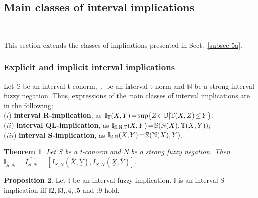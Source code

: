 \documentclass[12pt]{article}
\theoremstyle{plain}
\newtheorem{theorem}{Theorem}[section]
\theoremstyle{remark}
\theoremstyle{definition}
\theoremstyle{proposition}
\newtheorem{proposition}[theorem]{Proposition}
\newcommand{\II}{\mathbb{I} }
\newcommand{\UU}{\mathbb{U} }
\newcommand{\NN}{\mathbb{N} }
\newcommand{\TT}{\mathbb{T} }
\newcommand{\Ss}{\mathbb{S} }
\begin{document}
\subsection{Main classes of interval implications}~\label{subsec_int_class}

This section extends the classes of implications presented in Sect.~\ref{subsec-5a}.\vspace{-0.2cm}

\subsubsection{Explicit and implicit interval implications}\label{subsec-6a}

Let $\mathbb{S}$ be an interval t-conorm, $\mathbb{T}$ be an interval t-norm and $\NN$ be a strong interval fuzzy negation. Thus, expressions of the main classes of interval implications are in the following:\\
($i$) \hspace{-0.1cm}\textbf{interval R-implication}, as $\II_{\mathbb{T}}(X,Y)\hspace{-0.05cm}=\hspace{-0.05cm}\sup\{Z\hspace{-0.05cm}\in\hspace{-0.05cm} \UU|\TT(X,Z)\hspace{-0.05cm}\leq\hspace{-0.05cm}Y\}$;\\
($ii$)\hspace{-0.1cm} \textbf{interval QL-implication}, as $\II_{\Ss,\NN,\TT}(X,Y)\hspace{-0.05cm}=\hspace{-0.05cm}\Ss(\NN(X),\TT(X,Y));$\\
($iii$)\hspace{-0.1cm} \textbf{interval S-implication}, as $\II_{\Ss,\NN}(X,Y)\hspace{-0.05cm}=\hspace{-0.05cm}\Ss(\NN(X),Y)$.

\begin{theorem}\cite[Theorem 24]{Bed10b}\label{teo-S-imp-BIR}
Let $S$ be a t-conorm and $N$ be a strong fuzzy negation. Then
$\II_{\widehat{S},\widehat{N}}=\widehat{I_{S,N}}= [I_{S,N}(\overline{X},\underline{Y}), I_{S,N}(\underline{X},\overline{Y})]$.
\end{theorem}

\begin{proposition}\cite[Theorem 29]{Bed10b}\label{pro-int-simp-prop-3}
Let $\II$ be an interval fuzzy implication.  $\II$ is an interval S-implication iff $\II2,\II3$,$\II4,\II5$ and $\II9$ hold.
\end{proposition}
\end{document}

